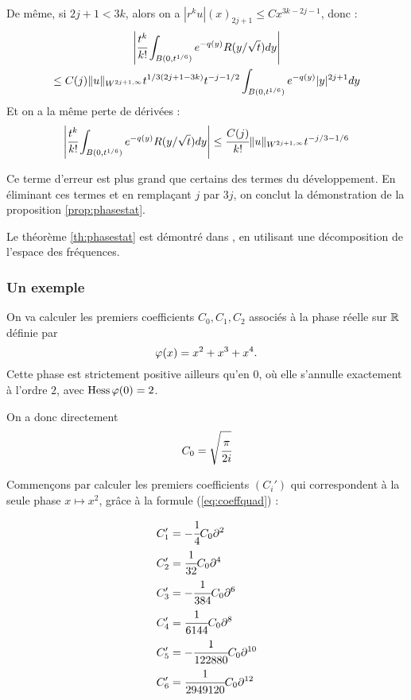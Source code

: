 \begin{preuve}
De même, si $2j+1 < 3k$, alors on a $|r^ku|(x)_{2j+1} \leq Cx^{3k-2j-1}$, donc :
\begin{multline*}
  \left|\cfrac{t^k}{k!}\int_{B(0,t^{1/6})}e^{-q(y)}R(y/\sqrt{t})dy\right| \\\leq C(j)\|u\|_{W^{2j+1,\infty}}t^{1/3(2j+1-3k)}t^{-j-1/2}\int_{B(0,t^{1/6})}e^{-q(y)}|y|^{2j+1}dy
\end{multline*}
\noindent Et on a la même perte de dérivées :
\begin{equation*}
  \left|\cfrac{t^k}{k!}\int_{B(0,t^{1/6})}e^{-q(y)}R(y/\sqrt{t})dy\right| \leq \cfrac{C(j)}{k!}\|u\|_{W^{2j+1,\infty}}t^{-j/3-1/6}
\end{equation*}

Ce terme d'erreur est plus grand que certains des termes du développement. En éliminant ces termes et en remplaçant $j$ par $3j$, on conclut la démonstration de la proposition \ref{prop:phasestat}.
\end{preuve}

\begin{rem}
	Le théorème \ref{th:phasestat} est démontré dans \cite{hormander2003analysis}, en utilisant une décomposition de l'espace des fréquences.
\end{rem}

\subsubsection{Un exemple}
On va calculer les premiers coefficients $C_0, C_1, C_2$ associés à la phase réelle sur $\mathbb{R}$ définie par
\begin{equation*}
	\varphi(x)=x^2 + x^3 + x^4.
\end{equation*}
\noindent Cette phase est strictement positive ailleurs qu'en $0$, où elle s'annulle exactement à l'ordre $2$, avec $\operatorname{Hess} \varphi(0)=2$.

On a donc directement
\begin{equation*}
	C_0 = \sqrt{\cfrac{\pi}{2i}}
\end{equation*}

Commençons par calculer les premiers coefficients $(C_i')$ qui correspondent à la seule phase $x \mapsto x^2$, grâce à la formule (\ref{eq:coeffquad}) : 

\begin{align*}
	C_1' &= -\cfrac{1}{4}C_0\partial^2\\
	C_2' &= \cfrac{1}{32}C_0\partial^4\\
	C_3' &= -\cfrac{1}{384}C_0\partial^6\\
	C_4' &= \cfrac{1}{6144}C_0\partial^8\\
	C_5' &= -\cfrac{1}{122880}C_0\partial^{10}\\
	C_6' &= \cfrac{1}{2949120}C_0\partial^{12}
\end{align*}

